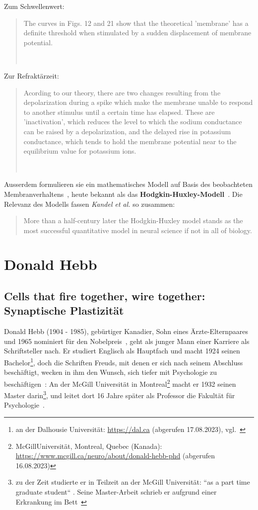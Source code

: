Zum Schwellenwert:
\blockquote[{~\cite[535]{HH52}}]{
    The curves in Figs. 12 and 21 show that the theoretical 'membrane' has a definite threshold when stimulated by a sudden displacement of membrane potential.
}

Zur Refraktärzeit:
\blockquote[{~\cite[532]{HH52}}]{
    Acording to our theory, there are two changes resulting from the depolarization during a spike which make the membrane unable to respond to another stimulus until a certain time has elapsed. These are 'inactivation', which reduces the level to which the sodium conductance can be raised by a depolarization, and the delayed rise in potassium conductance, which tends to hold the membrane potential near to the equilibrium value for potassium ions.
}

Ausserdem formulieren sie ein mathematisches Modell auf Basis des beobachteten Membranverhaltens~\cite[501, Fig. 1.]{HH52}, heute bekannt als das \textbf{Hodgkin-Huxley-Modell}~\cite[144]{Koc98}.
 Die Relevanz des Modells fassen \textit{Kandel et al.} so zusammen:

\blockquote[{\cite[156]{KSJ+13}}]{
    More than a half-century later the Hodgkin-Huxley model stands as the most successful quantitative model in neural science if not in all of biology.
}

\section{Donald Hebb}\label{appendix:hebb}
\subsection*{Cells that fire together, wire together: Synaptische Plastizität}

Donald Hebb (1904 - 1985), gebürtiger Kanadier, Sohn eines Ärzte-Elternpaares und 1965 nominiert für den Nobelpreis~\cite[1013 f.]{BM03}, geht als junger Mann einer Karriere als Schriftsteller nach.
Er studiert Englisch als Hauptfach und macht 1924 seinen Bachelor\footnote{
    an der Dalhousie Universität: \url{https://dal.ca} (abgerufen 17.08.2023), vgl.~\cite[852]{Coo05}
}, doch die Schriften Freuds, mit denen er sich nach seinem Abschluss beschäftigt, wecken in ihm den Wunsch, sich tiefer mit Psychologie zu beschäftigen~\cite[1013]{BM03}: An der McGill Universität in Montreal\footnote{
    McGillUniversität, Montreal, Quebec (Kanada): \url{https://www.mcgill.ca/neuro/about/donald-hebb-phd} (abgerufen 16.08.2023)
} macht er 1932 seinen Master darin\footnote{
    zu der Zeit studierte er in Teilzeit an der McGill Universität: ``as a part time graduate student`` \cite[1]{Kle99}. Seine Master-Arbeit schrieb er aufgrund einer Erkrankung im Bett~\cite[1014]{BM03}
}, und leitet dort 16 Jahre später als Professor die Fakultät für Psychologie~\cite[853]{Coo05}.

